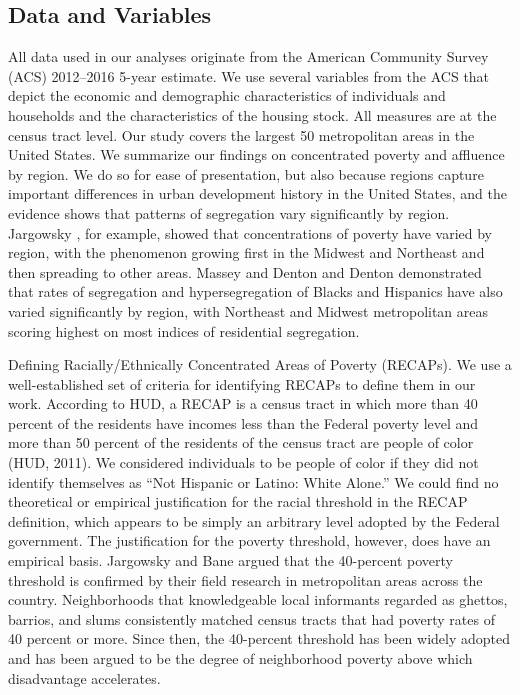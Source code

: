 \documentclass[11pt,]{article}
\begin{document}
\hypertarget{data-and-variables}{%
\subsection{Data and Variables}\label{data-and-variables}}

All data used in our analyses originate from the American Community
Survey (ACS) 2012--2016 5-year estimate. We use several variables from
the ACS that depict the economic and demographic characteristics of
individuals and households and the characteristics of the housing stock.
All measures are at the census tract level. Our study covers the largest
50 metropolitan areas in the United States. We summarize our findings on
concentrated poverty and affluence by region. We do so for ease of
presentation, but also because regions capture important differences in
urban development history in the United States, and the evidence shows
that patterns of segregation vary significantly by region. Jargowsky
\autocite*{jargowsky1997poverty}, for example, showed that
concentrations of poverty have varied by region, with the phenomenon
growing first in the Midwest and Northeast and then spreading to other
areas. Massey and Denton \autocite*{massey1989hs} and Denton
\autocite*{denton1994african} demonstrated that rates of segregation and
hypersegregation of Blacks and Hispanics have also varied significantly
by region, with Northeast and Midwest metropolitan areas scoring highest
on most indices of residential segregation.

Defining Racially/Ethnically Concentrated Areas of Poverty (RECAPs). We
use a well-established set of criteria for identifying RECAPs to define
them in our work. According to HUD, a RECAP is a census tract in which
more than 40 percent of the residents have incomes less than the Federal
poverty level and more than 50 percent of the residents of the census
tract are people of color (HUD, 2011). We considered individuals to be
people of color if they did not identify themselves as ``Not Hispanic or
Latino: White Alone.'' We could find no theoretical or empirical
justification for the racial threshold in the RECAP definition, which
appears to be simply an arbitrary level adopted by the Federal
government. The justification for the poverty threshold, however, does
have an empirical basis. Jargowsky and Bane
\autocite*{jargowsky1991ghetto} argued that the 40-percent poverty
threshold is confirmed by their field research in metropolitan areas
across the country. Neighborhoods that knowledgeable local informants
regarded as ghettos, barrios, and slums consistently matched census
tracts that had poverty rates of 40 percent or more. Since then, the
40-percent threshold has been widely adopted and has been argued to be
the degree of neighborhood poverty above which disadvantage accelerates.
\end{document}
